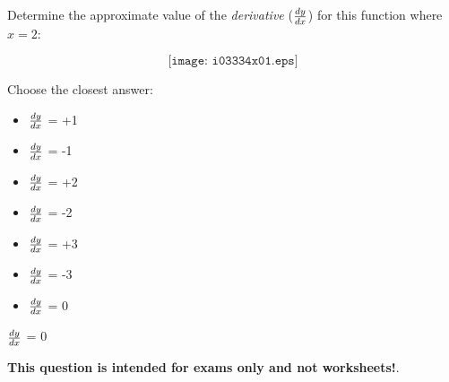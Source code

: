

Determine the approximate value of the {\it derivative} ($dy \over dx$) for this function where $x=2$:

$$\texttt{[image: i03334x01.eps]}$$

Choose the closest answer:

\begin{itemize}
\item{} $dy \over dx$ = +1
\vskip 10pt 
\item{} $dy \over dx$ = -1
\vskip 10pt 
\item{} $dy \over dx$ = +2
\vskip 10pt 
\item{} $dy \over dx$ = -2
\vskip 10pt 
\item{} $dy \over dx$ = +3
\vskip 10pt 
\item{} $dy \over dx$ = -3
\vskip 10pt 
\item{} $dy \over dx$ = 0
\end{itemize}







$dy \over dx$ = 0







{\bf This question is intended for exams only and not worksheets!}.




